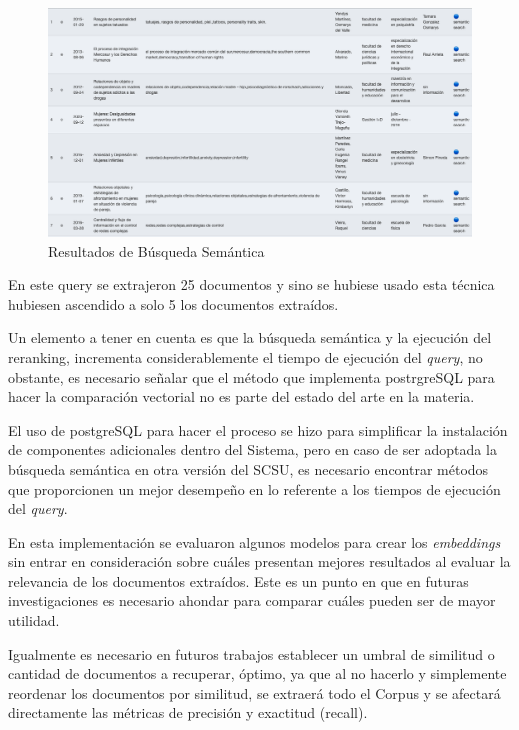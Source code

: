 \documentclass[
  12pt,
  openany]{book}
\begin{document}
\begin{figure}

{\centering \includegraphics[width=0.9\linewidth]{images/05-desarrollo/5_ciclo/resultsemantico} 

}

\caption{Resultados de Búsqueda Semántica}\label{fig:resultsemantico}
\end{figure}

En este query se extrajeron 25 documentos y sino se hubiese usado esta técnica hubiesen ascendido a solo 5 los documentos extraídos.

Un elemento a tener en cuenta es que la búsqueda semántica y la ejecución del reranking, incrementa considerablemente el tiempo de ejecución del \emph{query}, no obstante, es necesario señalar que el método que implementa postrgreSQL para hacer la comparación vectorial no es parte del estado del arte en la materia.

El uso de postgreSQL para hacer el proceso se hizo para simplificar la instalación de componentes adicionales dentro del Sistema, pero en caso de ser adoptada la búsqueda semántica en otra versión del SCSU, es necesario encontrar métodos que proporcionen un mejor desempeño en lo referente a los tiempos de ejecución del \emph{query}.

En esta implementación se evaluaron algunos modelos para crear los \emph{embeddings} sin entrar en consideración sobre cuáles presentan mejores resultados al evaluar la relevancia de los documentos extraídos. Este es un punto en que en futuras investigaciones es necesario ahondar para comparar cuáles pueden ser de mayor utilidad.

Igualmente es necesario en futuros trabajos establecer un umbral de similitud o cantidad de documentos a recuperar, óptimo, ya que al no hacerlo y simplemente reordenar los documentos por similitud, se extraerá todo el Corpus y se afectará directamente las métricas de precisión y exactitud (recall).
\end{document}
